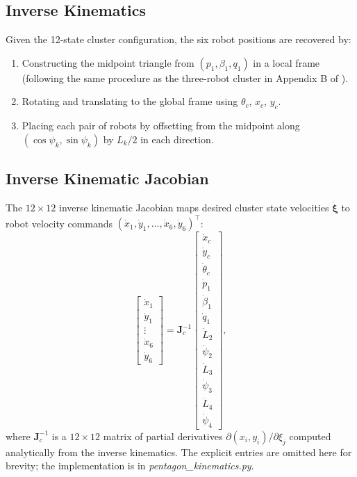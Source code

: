 \documentclass[lettersize,journal]{IEEEtran}
\begin{document}
\subsection{Inverse Kinematics}

Given the 12-state cluster configuration, the six robot positions are recovered
by:
\begin{enumerate}
    \item Constructing the midpoint triangle from $(p_1, \beta_1, q_1)$ in
          a local frame (following the same procedure as the three-robot
          cluster in Appendix B of \cite{14}).
    \item Rotating and translating to the global frame using $\theta_c$,
          $x_c$, $y_c$.
    \item Placing each pair of robots by offsetting from the midpoint along
          $(\cos\psi_k, \sin\psi_k)$ by $L_k/2$ in each direction.
\end{enumerate}

\subsection{Inverse Kinematic Jacobian}

The $12 \times 12$ inverse kinematic Jacobian maps desired cluster state
velocities $\dot{\boldsymbol{\xi}}$ to robot velocity commands
$(\dot{x}_1, \dot{y}_1, \ldots, \dot{x}_6, \dot{y}_6)^\top$:
\begin{equation}
    \begin{bmatrix} \dot{x}_1 \\ \dot{y}_1 \\ \vdots \\
    \dot{x}_6 \\ \dot{y}_6 \end{bmatrix}
    =
    \mathbf{J}_c^{-1}
    \begin{bmatrix} \dot{x}_c \\ \dot{y}_c \\ \dot{\theta}_c \\
    \dot{p}_1 \\ \dot{\beta}_1 \\ \dot{q}_1 \\
    \dot{L}_2 \\ \dot{\psi}_2 \\ \dot{L}_3 \\ \dot{\psi}_3 \\
    \dot{L}_4 \\ \dot{\psi}_4 \end{bmatrix},
    \label{eq:inv_kin_jac}
\end{equation}
where $\mathbf{J}_c^{-1}$ is a $12 \times 12$ matrix of partial derivatives
$\partial (x_i, y_i) / \partial \xi_j$ computed analytically from the inverse
kinematics. The explicit entries are omitted here for brevity; the
implementation is in \textit{pentagon\_kinematics.py}.
\end{document}
